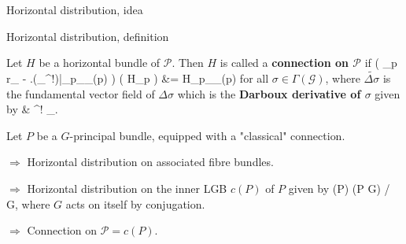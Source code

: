\documentclass[hyperref={pdfpagelabels=false}]{beamer}
\def\ba#1\ea{\begin{align}#1\end{align}}
\theoremstyle{plain}
\theoremstyle{remark}
\begin{document}
{\begin{frame}{Horizontal distribution, idea}
\begin{figure}
\end{figure}
\end{frame}

\begin{frame}{Horizontal distribution, definition}
	\begin{definition}[Connection, {[S.-R.\ F.]}]
	Let $H$ be a horizontal bundle of $\mathcal{P}$. Then $H$ is called a \textbf{connection on $\mathcal{P}$} if
	\ba
	\mleft( _p r_{\sigma} - \mleft.\mleft(\pi_{}^!\widetilde{\Delta \sigma}\mright)\mright|_{p\cdot \sigma_{\pi_{}(p)} } \mright)
	\mleft( H_p \mright)
	&=
	H_{p\cdot \sigma_{\pi_{}(p)} }
	\ea
	for all $\sigma \in \Gamma(\mathcal{G})$,
	where $\widetilde{\Delta \sigma}$ is the fundamental vector field of $\Delta\sigma$ which is the \textbf{Darboux derivative of $\sigma$} given by
	\ba
	\Delta\sigma
	&\coloneqq
	\sigma^! \mu_{}.
	\ea
	\end{definition}
\end{frame}

\begin{frame}
\begin{example}
Let $P$ be a $G$-principal bundle, equipped with a "classical" connection. 
\pause

$\Rightarrow$ Horizontal distribution on associated fibre bundles.
\pause

$\Rightarrow$ Horizontal distribution on the inner LGB $c(P)$ of $P$ given by
\ba
c(P) \coloneqq (P \times G) \Big/ G,
\ea
where $G$ acts on itself by conjugation.
\pause

$\Rightarrow$ Connection on $\mathcal{P} = c(P)$.
\end{example}
\end{frame}
}
\end{document}
